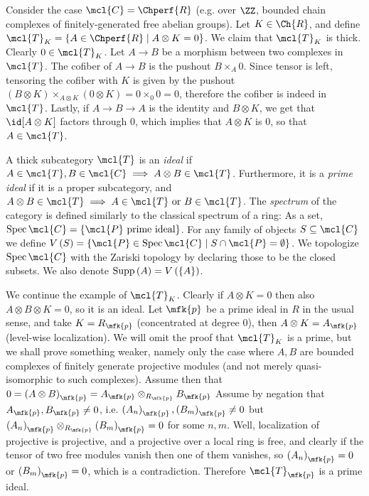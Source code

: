 \begin{example}
	Consider the case $\mcl{C} = \Chperf{R}$ (e.g. over $\ZZ$, bounded chain complexes of finitely-generated free abelian groups).
	Let $K \in \Ch{R}$, and define
	$\mcl{T}_K = \left\{ A \in \Chperf{R} \mid A \otimes K = 0 \right\}$.
	We claim that $\mcl{T}_K$ is thick.
	Clearly $0 \in \mcl{T}_K$.
	Let $A \to B$ be a morphism between two complexes in $\mcl{T}$. The cofiber of $A \to B$ is the pushout $B \times_{A} 0$. Since tensor is left, tensoring the cofiber with $K$ is given by the pushout
	$\left(B \otimes K\right) \times_{A \otimes K} \left(0 \otimes K\right) = 0 \times_0 0 = 0$, therefore the cofiber is indeed in $\mcl{T}$.
	Lastly, if $A \to B \to A$ is the identity and $B \otimes K$, we get that $\id[A \otimes K]$ factors through $0$, which implies that $A \otimes K$ is $0$, so that $A \in \mcl{T}$.
\end{example}

\begin{definition}
	A thick subcategory $\mcl{T}$ is an \emph{ideal} if $A \in \mcl{T}, B \in \mcl{C} \implies A \otimes B \in \mcl{T}$.
	Furthermore, it is a \emph{prime ideal} if it is a proper subcategory, and $A \otimes B \in \mcl{T} \implies A \in \mcl{T} \textrm{ or } B \in \mcl{T}$.
	The \emph{spectrum} of the category is defined similarly to the classical spectrum of a ring:
	As a set, $\spec \mcl{C} = \left\{ \mcl{P}\textrm{ prime ideal} \right\}$.
	For any family of objects $S \subseteq \mcl{C}$ we define $V\left(S\right) = \left\{ \mcl{P} \in \spec \mcl{C} \mid S \cap \mcl{P} = \emptyset \right\}$.
	We topologize $\spec \mcl{C}$ with the Zariski topology by declaring those to be the closed subsets.
	We also denote $\operatorname{Supp}\left(A\right) = V\left(\left\{ A \right\}\right)$.
\end{definition}

\begin{example}
	We continue the example of $\mcl{T}_K$.
	Clearly if $A \otimes K = 0$ then also $A \otimes B \otimes K = 0$, so it is an ideal.
	Let $\mfk{p}$ be a prime ideal in $R$ in the usual sense, and take $K = R_\mfk{p}$ (concentrated at degree $0$),
	then $A \otimes K = A_\mfk{p}$ (level-wise localization).
	We will omit the proof that $\mcl{T}_K$ is a prime, but we shall prove something weaker, namely only the case where $A,B$ are bounded complexes of finitely generate projective modules (and not merely quasi-isomorphic to such complexes).
	Assume then that
	$
	0
	= \left(A \otimes B\right)_\mfk{p}
	= A_\mfk{p} \otimes_{R_\mfk{p}} B_\mfk{p}
	$
	Assume by negation that $A_\mfk{p}, B_\mfk{p} \neq 0$,
	i.e. $\left(A_n\right)_\mfk{p}, \left(B_m\right)_\mfk{p} \neq 0$ but $\left(A_n\right)_\mfk{p} \otimes_{R_\mfk{p}} \left(B_m\right)_\mfk{p} = 0$ for some $n,m$.
	Well, localization of projective is projective, and a projective over a local ring is free, and clearly if the tensor of two free modules vanish then one of them vanishes, so $\left(A_n\right)_\mfk{p} = 0$ or $\left(B_m\right)_\mfk{p} = 0$, which is a contradiction.
	Therefore $\mcl{T}_\mfk{p}$ is a prime ideal.
\end{example}

